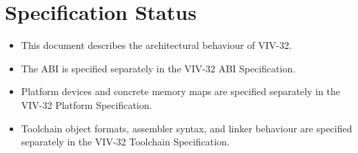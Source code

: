\section{Specification Status}

\begin{itemize}
  \item This document describes the architectural behaviour of VIV-32.
  \item The ABI is specified separately in the VIV-32 ABI Specification.
  \item Platform devices and concrete memory maps are specified separately in
        the VIV-32 Platform Specification.
  \item Toolchain object formats, assembler syntax, and linker behaviour are
        specified separately in the VIV-32 Toolchain Specification.
\end{itemize}
